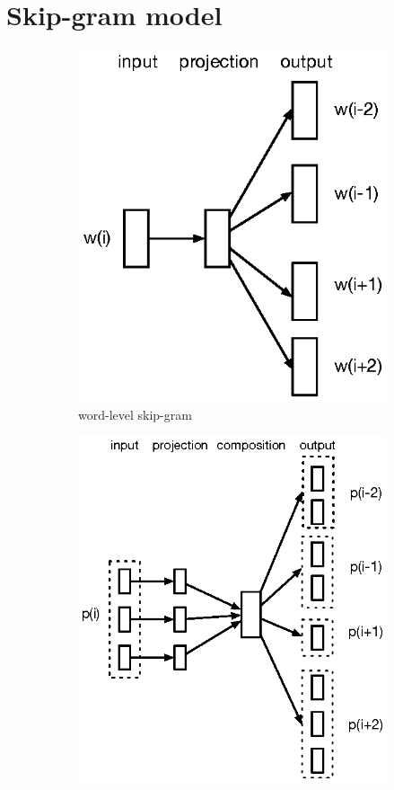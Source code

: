 \section{Skip-gram model}
\label{sec:skip}
\begin{figure}
\begin{subfigure}[b]{0.4\textwidth}
        \includegraphics{./skip-gram.eps}
    \caption{word-level skip-gram}
    \label{fig:1a}
\end{subfigure}
\hfill
\begin{subfigure}[b]{0.55\textwidth}
    \includegraphics{./phrase-skipgram.eps}

\end{subfigure}
\end{figure}
